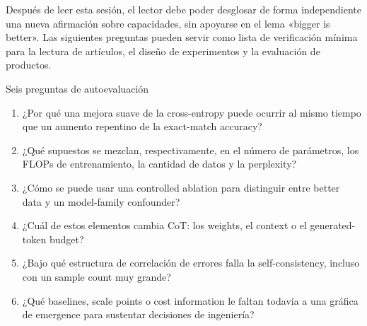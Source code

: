 Después de leer esta sesión, el lector debe poder desglosar de forma independiente una nueva afirmación sobre capacidades, sin apoyarse en el lema «bigger is better». Las siguientes preguntas pueden servir como lista de verificación mínima para la lectura de artículos, el diseño de experimentos y la evaluación de productos.

\begin{importantbox}{Seis preguntas de autoevaluación}
\begin{enumerate}
  \item ¿Por qué una mejora suave de la cross-entropy puede ocurrir al mismo tiempo que un aumento repentino de la exact-match accuracy?
  \item ¿Qué supuestos se mezclan, respectivamente, en el número de parámetros, los FLOPs de entrenamiento, la cantidad de datos y la perplexity?
  \item ¿Cómo se puede usar una controlled ablation para distinguir entre better data y un model-family confounder?
  \item ¿Cuál de estos elementos cambia CoT: los weights, el context o el generated-token budget?
  \item ¿Bajo qué estructura de correlación de errores falla la self-consistency, incluso con un sample count muy grande?
  \item ¿Qué baselines, scale points o cost information le faltan todavía a una gráfica de emergence para sustentar decisiones de ingeniería?
\end{enumerate}
\end{importantbox}


